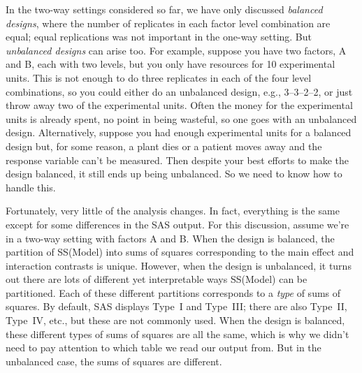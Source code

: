 \documentclass[a4paper, 12pt]{article}
\theoremstyle{plain}
\theoremstyle{definition}
\theoremstyle{remark}
\begin{document}
In the two-way settings considered so far, we have only discussed {\em balanced designs}, where the number of replicates in each factor level combination are equal; equal replications was not important in the one-way setting.  But {\em unbalanced designs} can arise too.  For example, suppose you have two factors, A and B, each with two levels, but you only have resources for 10 experimental units.  This is not enough to do three replicates in each of the four level combinations, so you could either do an unbalanced design, e.g., 3--3--2--2, or just throw away two of the experimental units.  Often the money for the experimental units is already spent, no point in being wasteful, so one goes with an unbalanced design.  Alternatively, suppose you had enough experimental units for a balanced design but, for some reason, a plant dies or a patient moves away and the response variable can't be measured.  Then despite your best efforts to make the design balanced, it still ends up being unbalanced.  So we need to know how to handle this.  

Fortunately, very little of the analysis changes.  In fact, everything is the same except for some differences in the SAS output.  For this discussion, assume we're in a two-way setting with factors A and B.  When the design is balanced, the partition of SS(Model) into sums of squares corresponding to the main effect and interaction contrasts is unique.  However, when the design is unbalanced, it turns out there are lots of different yet interpretable ways SS(Model) can be partitioned.  Each of these different partitions corresponds to a {\em type} of sums of squares.  By default, SAS displays Type~I and Type~III; there are also Type~II, Type~IV, etc., but these are not commonly used.  When the design is balanced, these different types of sums of squares are all the same, which is why we didn't need to pay attention to which table we read our output from.  But in the unbalanced case, the sums of squares are different.  
\end{document}
